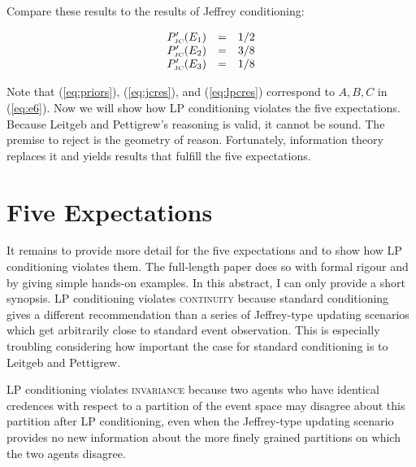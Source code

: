 \documentclass[11pt]{article}
\begin{document}
Compare these results to the results of Jeffrey conditioning:

\begin{equation}
  \label{eq:jcres}
  \begin{array}{rcl}
    P'_{\mbox{\tiny JC}}(E_{1})&=&1/2 \\
    P'_{\mbox{\tiny JC}}(E_{2})&=&3/8 \\
    P'_{\mbox{\tiny JC}}(E_{3})&=&1/8
  \end{array}
\end{equation}

Note that (\ref{eq:priors}), (\ref{eq:jcres}), and (\ref{eq:lpcres})
correspond to $A,B,C$ in (\ref{eq:e6}). Now we will show how LP
conditioning violates the five expectations. Because Leitgeb and
Pettigrew's reasoning is valid, it cannot be sound. The premise to
reject is the geometry of reason. Fortunately, information theory
replaces it and yields results that fulfill the five expectations.

\section{Five Expectations}
\label{fivex}

It remains to provide more detail for the five expectations and to
show how LP conditioning violates them. The full-length paper does so
with formal rigour and by giving simple hands-on examples. In this
abstract, I can only provide a short synopsis. LP conditioning
violates \textsc{continuity} because standard conditioning gives a
different recommendation than a series of Jeffrey-type updating
scenarios which get arbitrarily close to standard event observation.
This is especially troubling considering how important the case for
standard conditioning is to Leitgeb and Pettigrew.

LP conditioning violates \textsc{invariance} because two agents who
have identical credences with respect to a partition of the event
space may disagree about this partition after LP conditioning, even
when the Jeffrey-type updating scenario provides no new information
about the more finely grained partitions on which the two agents
disagree.
\end{document}

